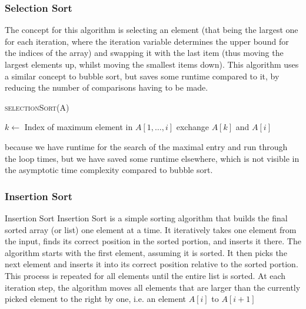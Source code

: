 \subsubsection{Selection Sort}
The concept for this algorithm is selecting an element (that being the largest one for each iteration, where the iteration variable determines the upper bound for the indices of the array) and swapping it with the last item (thus moving the largest elements up, whilst moving the smallest items down). This algorithm uses a similar concept to bubble sort, but saves some runtime compared to it, by reducing the number of comparisons having to be made.
\begin{algorithm}
    \begin{spacing}{1.2}
        \caption{\textsc{selectionSort(A)}}
        \begin{algorithmic}[1]
                \State $k \gets$ Index of maximum element in $A[1, \ldots, i]$ 
                \State exchange $A[k]$ and $A[i]$
            \EndFor
        \end{algorithmic}
    \end{spacing}
\end{algorithm}

 because we have runtime  for the search of the maximal entry and run through the loop  times, but we have saved some runtime elsewhere, which is not visible in the asymptotic time complexity compared to bubble sort.



\newpage
\subsubsection{Insertion Sort}
\begin{definition}[]{Insertion Sort}
    Insertion Sort is a simple sorting algorithm that builds the final sorted array (or list) one element at a time. It iteratively takes one element from the input, finds its correct position in the sorted portion, and inserts it there. The algorithm starts with the first element, assuming it is sorted. It then picks the next element and inserts it into its correct position relative to the sorted portion. This process is repeated for all elements until the entire list is sorted. At each iteration step, the algorithm moves all elements that are larger than the currently picked element to the right by one, i.e. an element $A[i]$ to $A[i + 1]$
\end{definition}

